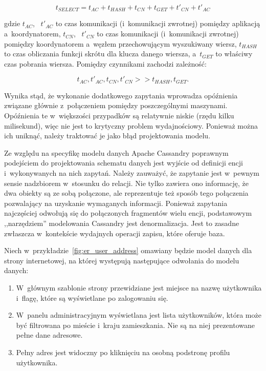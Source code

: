 \begin{equation}
	t_{SELECT} = t_{AC} + t_{HASH} + t_{CN} + t_{GET} + t'_{CN} + t'_{AC}
	\label{eq:select_time}
\end{equation}

gdzie $t_{AC}$, ~$t'_{AC}$ to czas komunikacji (i~komunikacji zwrotnej) pomiędzy aplikacją a~koordynatorem, $t_{CN}$, ~$t'_{CN}$ to czas komunikacji (i~komunikacji zwrotnej) pomiędzy koordynatorem a~węzłem przechowującym wyszukiwany wiersz, $t_{HASH}$ to czas obliczania funkcji skrótu dla klucza danego wiersza, a~$t_{GET}$ to właściwy czas pobrania wiersza. Pomiędzy czynnikami zachodzi zależność:

\begin{equation}
 t_{AC}, t'_{AC}, t_{CN}, t'_{CN} >> t_{HASH}, t_{GET}.
\end{equation}

Wynika stąd, że wykonanie dodatkowego zapytania wprowadza opóźnienia związane głównie z~połączeniem pomiędzy poszczególnymi maszynami. Opóźnienia te w~większości przypadków są relatywnie niskie (rzędu kilku milisekund), więc nie jest to krytyczny problem wydajnościowy. Ponieważ można ich uniknąć, należy traktować je jako błąd projektowania modelu.

Ze względu na specyfikę modelu danych Apache Cassandry poprawnym podejściem do projektowania schematu danych jest wyjście od definicji encji i~wykonywanych na nich zapytań. Należy zauważyć, że zapytanie jest w~pewnym sensie nadzbiorem w~stosunku do relacji. Nie tylko zawiera ono informację, że dwa obiekty są ze sobą połączone, ale reprezentuje też sposób tego połączenia pozwalający na uzyskanie wymaganych informacji. Ponieważ zapytania najczęściej odwołują się do połączonych fragmentów wielu encji, podstawowym ,,narzędziem'' modelowania Cassandry jest denormalizacja. Jest to zasadne zwłaszcza w~kontekście wydajnych operacji zapisu, które oferuje baza.

Niech w~przykładzie~\ref{fig:er_user_address} omawiany będzie model danych dla strony internetowej, na której występują następujące odwołania do modelu danych:

\begin{enumerate}
	\item \label{enum:username_flag} W~głównym szablonie strony przewidziane jest miejsce na nazwę użytkownika i~flagę, które są wyświetlane po zalogowaniu się.
	\item \label{enum:user_city_country} W~panelu administracyjnym wyświetlana jest lista użytkowników, która może być filtrowana po mieście i~kraju zamieszkania. Nie są na niej prezentowane pełne dane adresowe.
	\item \label{enum:full_address} Pełny adres jest widoczny po kliknięciu na osobną podstronę profilu użytkownika.
\end{enumerate}

